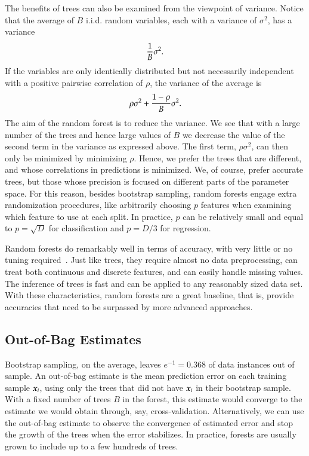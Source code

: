 \begin{refsection}
The benefits of trees can also be examined from the viewpoint of variance. Notice that the average of $B$ i.i.d. random variables, each with a variance of $\sigma^2$, has a variance
$${1\over B}\sigma^2.$$
If the variables are only identically distributed but not necessarily independent with a positive pairwise correlation of $\rho$, the variance of the average is
$$\rho\sigma^2+{1-\rho\over B}\sigma^2.$$
The aim of the random forest is to reduce the variance. We see that with a large number of the trees and hence large values of $B$ we decrease the value of the second term in the variance as expressed above. The first term, $\rho\sigma^2$, can then only be minimized by minimizing $\rho$. Hence, we prefer the trees that are different, and whose correlations in predictions is minimized. We, of course, prefer accurate trees, but those whose precision is focused on different parts of the parameter space. For this reason, besides bootstrap sampling, random forests engage extra randomization procedures, like arbitrarily choosing $p$ features when examining which feature to use at each split. In practice, $p$ can be relatively small and equal to $p=\sqrt{D}$ for classification and $p=D/3$ for regression.

Random forests do remarkably well in terms of accuracy, with very little or no tuning required~\cite{Fernandez-Delgado2014}. Just like trees, they require almost no data preprocessing, can treat both continuous and discrete features, and can easily handle missing values. The inference of trees is fast and can be applied to any reasonably sized data set. With these characteristics, random forests are a great baseline, that is, provide accuracies that need to be surpassed by more advanced approaches.

\subsection*{Out-of-Bag Estimates}

Bootstrap sampling, on the average, leaves $e^{-1}=0.368$ of data instances out of sample. An out-of-bag estimate is the mean prediction error on each training sample $\boldsymbol{x}_i$, using only the trees that did not have $\boldsymbol{x}_i$ in their bootstrap sample. With a fixed number of trees $B$ in the forest, this estimate would converge to the estimate we would obtain through, say, cross-validation. Alternatively, we can use the out-of-bag estimate to observe the convergence of estimated error and stop the growth of the trees when the error stabilizes. In practice, forests are usually grown to include up to a few hundreds of trees.


\end{refsection}
